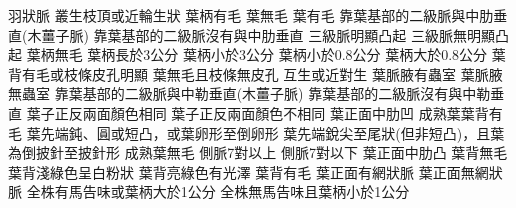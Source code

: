 \documentclass[12pt,a4paper]{article}
\begin{document}
\begin{Key*}{}
\alter 羽狀脈
    \alter 叢生枝頂或近輪生狀
        \alter 葉柄有毛
            \alter 葉無毛
            \alter 葉有毛
                \alter 靠葉基部的二級脈與中肋垂直(木薑子脈)
                \alter 靠葉基部的二級脈沒有與中肋垂直
                    \alter 三級脈明顯凸起
                    \alter 三級脈無明顯凸起
        \alter 葉柄無毛
            \alter 葉柄長於3公分
            \alter 葉柄小於3公分
                \alter 葉柄小於0.8公分
                \alter 葉柄大於0.8公分
                    \alter 葉背有毛或枝條皮孔明顯
                    \alter 葉無毛且枝條無皮孔
    \alter 互生或近對生
        \alter 葉脈腋有蟲室
        \alter 葉脈腋無蟲室
            \alter 靠葉基部的二級脈與中勒垂直(木薑子脈)
            \alter 靠葉基部的二級脈沒有與中勒垂直
                \alter 葉子正反兩面顏色相同
                \alter 葉子正反兩面顏色不相同
                    \alter 葉正面中肋凹
                        \alter 成熟葉葉背有毛
                            \alter 葉先端鈍、圓或短凸，或葉卵形至倒卵形
                            \alter 葉先端銳尖至尾狀(但非短凸)，且葉為倒披針至披針形
                        \alter 成熟葉無毛
                            \alter 側脈7對以上
                            \alter 側脈7對以下
                    \alter 葉正面中肋凸
                        \alter 葉背無毛
                            \alter 葉背淺綠色呈白粉狀
                            \alter 葉背亮綠色有光澤
                        \alter 葉背有毛
                            \alter 葉正面有網狀脈
                            \alter 葉正面無網狀脈
                                \alter 全株有馬告味或葉柄大於1公分
                                \alter 全株無馬告味且葉柄小於1公分
\end{Key*}
\newpage
\end{document}

